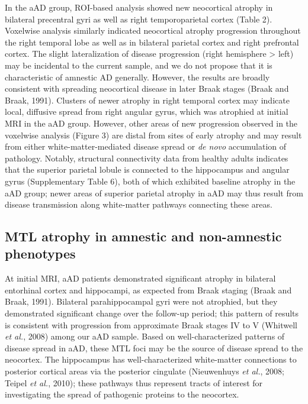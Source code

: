 \documentclass[]{article}
\begin{document}
In the aAD group, ROI-based analysis showed new neocortical atrophy in
bilateral precentral gyri as well as right temporoparietal cortex (Table
2). Voxelwise analysis similarly indicated neocortical atrophy
progression throughout the right temporal lobe as well as in bilateral
parietal cortex and right prefrontal cortex. The slight lateralization
of disease progression (right hemisphere \textgreater{} left) may be
incidental to the current sample, and we do not propose that it is
characteristic of amnestic AD generally. However, the results are
broadly consistent with spreading neocortical disease in later Braak
stages (Braak and Braak, 1991). Clusters of newer atrophy in right
temporal cortex may indicate local, diffusive spread from right angular
gyrus, which was atrophied at initial MRI in the aAD group. However,
other areas of new progression observed in the voxelwise analysis
(Figure 3) are distal from sites of early atrophy and may result from
either white-matter-mediated disease spread or \emph{de novo}
accumulation of pathology. Notably, structural connectivity data from
healthy adults indicates that the superior parietal lobule is connected
to the hippocampus and angular gyrus (Supplementary Table 6), both of
which exhibited baseline atrophy in the aAD group; newer areas of
superior parietal atrophy in aAD may thus result from disease
transmission along white-matter pathways connecting these areas.

\subsection*{MTL atrophy in amnestic and non-amnestic
phenotypes}\label{mtl-atrophy-in-amnestic-and-non-amnestic-phenotypes}

At initial MRI, aAD patients demonstrated significant atrophy in
bilateral entorhinal cortex and hippocampi, as expected from Braak
staging (Braak and Braak, 1991). Bilateral parahippocampal gyri were not
atrophied, but they demonstrated significant change over the follow-up
period; this pattern of results is consistent with progression from
approximate Braak stages IV to V (Whitwell \emph{et al.}, 2008) among
our aAD sample. Based on well-characterized patterns of disease spread
in aAD, these MTL foci may be the source of disease spread to the
neocortex. The hippocampus has well-characterized white-matter
connections to posterior cortical areas via the posterior cingulate
(Nieuwenhuys \emph{et al.}, 2008; Teipel \emph{et al.}, 2010); these
pathways thus represent tracts of interest for investigating the spread
of pathogenic proteins to the neocortex.
\end{document}
